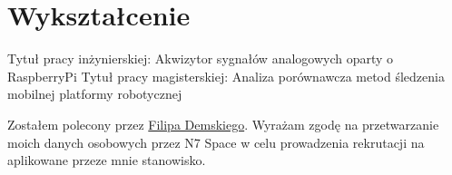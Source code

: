 \documentclass[a4paper]{comcv}
\begin{document}
\vspace{\topsep}

\section{Wykształcenie}

\vspace{\topsep}
Tytuł pracy inżynierskiej: Akwizytor sygnałów analogowych oparty o RaspberryPi
\vspace{\topsep}
Tytuł pracy magisterskiej: Analiza porównawcza metod śledzenia mobilnej platformy robotycznej

\vspace{\topsep}

Zostałem polecony przez \href{https://www.linkedin.com/in/filip-demski-2a6405118/}{Filipa Demskiego}. Wyrażam zgodę na przetwarzanie moich danych osobowych przez N7 Space w celu prowadzenia rekrutacji na aplikowane przeze mnie stanowisko.
\end{document}
